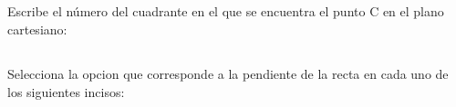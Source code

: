 \documentclass[12pt,addpoints,answers]{evalua}
\begin{document}
\begin{questions}
      \subsection*{\else{}\fi}
      \question[2] Escribe el número del cuadrante en el que se encuentra el punto C en el plano cartesiano: \fillin[4 cuad.][1in]

      \newpage
      \subsection*{\else{}\fi}
      \question[8] Selecciona la opcion que corresponde a la pendiente de la recta en cada uno de los siguientes incisos:
      \begin{multicols}{2}
\end{multicols}
\end{questions}
\end{document}
